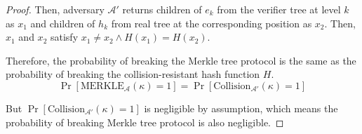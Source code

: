 \begin{proof}
Then, adversary $\mathcal{A}'$ returns children of $e_k$ from the verifier tree at level $k$ as $x_1$ and children of $h_k$ from real tree at the corresponding position as $x_2$. Then, $x_1$ and $x_2$ satisfy $x_1 \neq x_2 \land H(x_1) = H(x_2)$.

Therefore, the probability of breaking the Merkle tree protocol is the same as the probability of breaking the collision-resistant hash function $H$.
$$
\Pr[\mathrm{MERKLE}_{\mathcal{A}}(\kappa) = 1] = \Pr[\mathrm{Collision}_{\mathcal{A}'}(\kappa) = 1]
$$

But $\Pr[\mathrm{Collision}_{\mathcal{A}'}(\kappa) = 1]$ is negligible by assumption, which means the probability of breaking Merkle tree protocol is also negligible.

\end{proof}
